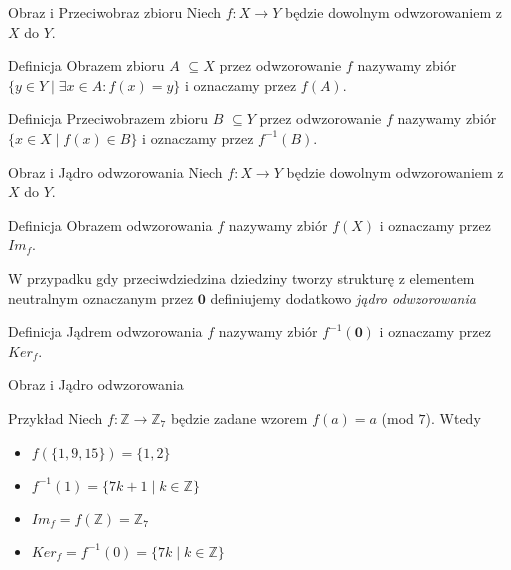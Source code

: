\documentclass{beamer}
\begin{document}
\begin{frame}{Obraz i Przeciwobraz zbioru}
    Niech $f : X \rightarrow Y$ będzie dowolnym odwzorowaniem z $X$ do $Y$. 
    \begin{block}{Definicja}
        \alert{Obrazem zbioru $A$} $ \subseteq X$ przez odwzorowanie $f$ nazywamy zbiór 
        $\{y \in Y \mid \exists x \in A : f(x) = y\}$ i oznaczamy przez $f(A)$.
    \end{block}
    \begin{block}{Definicja}
        \alert{Przeciwobrazem zbioru $B$ } $ \subseteq Y$ przez odwzorowanie $f$ nazywamy zbiór 
        $\{ x \in X  \mid  f(x) \in B \}$ i oznaczamy przez $f^{-1}(B)$.
    \end{block}
\end{frame}

\begin{frame}{Obraz i Jądro odwzorowania }
    Niech $f : X \rightarrow Y$ będzie dowolnym odwzorowaniem z $X$ do $Y$. 
    \begin{block}{Definicja}
        \alert{Obrazem odwzorowania $f$} nazywamy zbiór $f(X)$ i oznaczamy przez $Im_f$.
    \end{block}
    W przypadku gdy przeciwdziedzina dziedziny tworzy strukturę z elementem neutralnym oznaczanym przez $\mathbf{0}$
    definiujemy dodatkowo \textit{jądro odwzorowania}
    \begin{block}{Definicja}
        \alert{Jądrem odwzorowania $f$} nazywamy zbiór $f^{-1}(\mathbf{0})$ i oznaczamy przez $Ker_f$.
    \end{block}
\end{frame}

\begin{frame}{Obraz i Jądro odwzorowania}
    \begin{exampleblock}{Przykład}
        Niech $f : \mathbb{Z} \rightarrow \mathbb{Z}_7$ będzie zadane wzorem $f(a) = a $ (mod $7$).
        Wtedy
        \begin{itemize}
            \item $f(\{1,9,15\}) = \{1,2\}$
            \item $f^{-1}(1) = \{ 7k + 1 \mid k \in \mathbb{Z}\}$
            \item $Im_f = f(\mathbb{Z}) = \mathbb{Z}_7$
            \item $Ker_f =f^{-1}(0) = \{ 7k \mid k \in \mathbb{Z} \}$ 
        \end{itemize}
    \end{exampleblock}
\end{frame}
\end{document}
